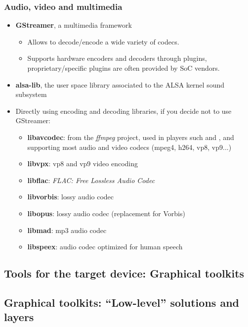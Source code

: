 \begin{frame}
  \frametitle{Audio, video and multimedia}
  \begin{itemize}
  \item {\bf GStreamer}, a multimedia framework
    \begin{itemize}
    \item Allows to decode/encode a wide variety of codecs.
    \item Supports hardware encoders and decoders through plugins,
      proprietary/specific plugins are often provided by SoC vendors.
    \end{itemize}
  \item {\bf alsa-lib}, the user space library associated to the ALSA
    kernel sound subsystem
  \item Directly using encoding and decoding libraries, if you decide
    not to use GStreamer:
    \begin{itemize}
    \item {\bf libavcodec}: from the {\em ffmpeg} project, used in players
          such  and , and supporting most audio and
          video codecs (mpeg4, h264, vp8, vp9...)
    \item {\bf libvpx}: vp8 and vp9 video encoding
    \item {\bf libflac}: {\em FLAC: Free Lossless Audio Codec}
    \item {\bf libvorbis}: lossy audio codec
    \item {\bf libopus}: lossy audio codec (replacement for Vorbis)
    \item {\bf libmad}: mp3 audio codec
    \item {\bf libspeex}: audio codec optimized for human speech
    \end{itemize}
  \end{itemize}
\end{frame}

\subsection[Graphical toolkits]{Tools for the target device: Graphical
  toolkits}

\subsection[Low-level toolkits]{Graphical toolkits:
``Low-level'' solutions and layers}

